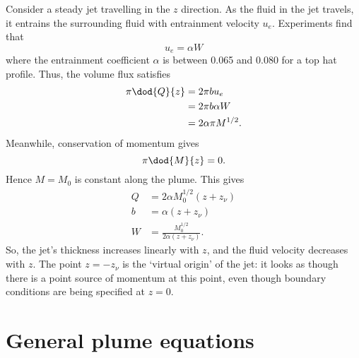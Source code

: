 Consider a steady jet travelling in the $z$ direction. As the fluid in the jet travels, it entrains the surrounding fluid with entrainment velocity $u_e$. Experiments find that
\begin{equation}
 u_e = \alpha W 
\end{equation} 
where the entrainment coefficient $\alpha$ is between 0.065 and 0.080 for a top hat profile. Thus, the volume flux satisfies
\begin{align}
 \pi \dod{Q}{z}	&= 2\pi b u_e \\
 			&= 2\pi b \alpha W \\
			&= 2\alpha\pi M^{1/2}.
\end{align}
Meanwhile, conservation of momentum gives
\begin{equation}
 \pi \dod{M}{z} = 0.
\end{equation}
Hence $M = M_0$ is constant along the plume. This gives
\begin{align}
 Q 	&= 2\alpha M_0^{1/2} (z+z_\nu) \\
 b	&= \alpha (z+z_\nu) \\
 W	&= \frac{M_0^{1/2}} {2\alpha (z+z_\nu)}.
\end{align}
So, the jet's thickness increases linearly with $z$, and the fluid velocity decreases with $z$. The point $z = -z_\nu$ is the `virtual origin' of the jet: it looks as though there is a point source of momentum at this point, even though boundary conditions are being specified at $z=0$. 

\section{General plume equations}

